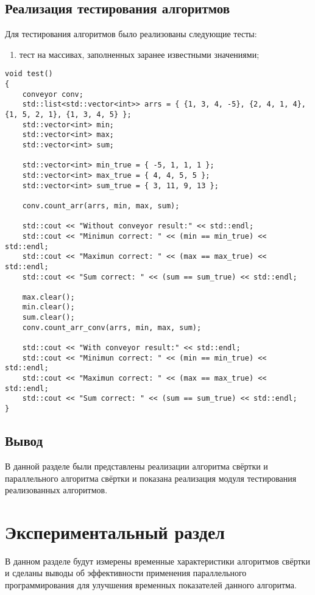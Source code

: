 \section{Реализация тестирования алгоритмов}

Для тестирования алгоритмов было реализованы следующие тесты:
\begin{enumerate}
	\item тест на массивах, заполненных заранее известными значениями;
\end{enumerate}

\begin{lstlisting}[label=some-code-7,caption=Реализация тестов]      
void test()
{
	conveyor conv;
	std::list<std::vector<int>> arrs = { {1, 3, 4, -5}, {2, 4, 1, 4}, {1, 5, 2, 1}, {1, 3, 4, 5} };
	std::vector<int> min;
	std::vector<int> max;
	std::vector<int> sum;

	std::vector<int> min_true = { -5, 1, 1, 1 };
	std::vector<int> max_true = { 4, 4, 5, 5 };
	std::vector<int> sum_true = { 3, 11, 9, 13 };

	conv.count_arr(arrs, min, max, sum);

	std::cout << "Without conveyor result:" << std::endl;
	std::cout << "Minimun correct: " << (min == min_true) << std::endl;
	std::cout << "Maximun correct: " << (max == max_true) << std::endl;
	std::cout << "Sum correct: " << (sum == sum_true) << std::endl;

	max.clear();
	min.clear();
	sum.clear();
	conv.count_arr_conv(arrs, min, max, sum);

	std::cout << "With conveyor result:" << std::endl;
	std::cout << "Minimun correct: " << (min == min_true) << std::endl;
	std::cout << "Maximun correct: " << (max == max_true) << std::endl;
	std::cout << "Sum correct: " << (sum == sum_true) << std::endl;
}
\end{lstlisting}

\section{Вывод}
В данной разделе были представлены реализации алгоритма свёртки и параллельного алгоритма свёртки и показана реализация модуля тестирования реализованных алгоритмов.

\chapter{Экспериментальный раздел}

В данном разделе будут измерены временные характеристики алгоритмов свёртки и сделаны выводы об эффективности применения параллельного программирования для улучшения временных показателей данного алгоритма.

